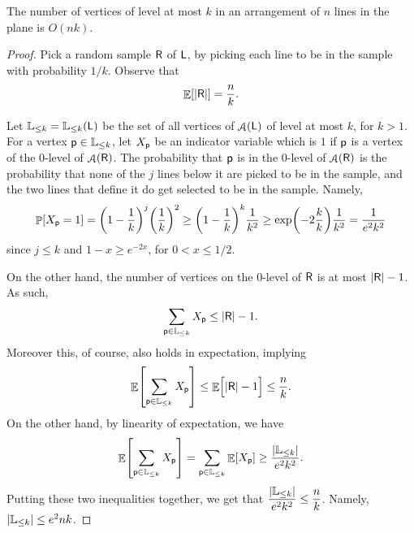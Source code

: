 \begin{theorem}
    The number of vertices of level at most $k$ in an arrangement of
    $n$ lines in the plane is $O(n k)$.

\end{theorem}

\begin{proof}
    Pick a random sample  $\mathsf{R}$ of
    $\mathsf{L}$, by picking each line to be in the sample with
    probability $1/k$. Observe that
    \[
        \mathop{\mathbb{E}}\!\left[ {\left| {\mathsf{R}} \right|} \right] = \frac{n}{k}.
    \]

    Let $\AtMostKLevelChar = \AtMostKLevel{\LineSet}$ be the set of
    all vertices of $\mathop{\mathrm{\EuScript{A}}}(\mathsf{L})$ of level at most $k$, for $k >
    1$.  For a vertex $\mathsf{p} \in \mathbb{L}_{\leq k}$, let $X_{\mathsf{p}}$ be an
    indicator variable which is $1$ if $\mathsf{p}$ is a vertex of the
    $0$-level of $\mathop{\mathrm{\EuScript{A}}}(\mathsf{R})$.  The probability that $\mathsf{p}$ is in
    the $0$-level of $\mathop{\mathrm{\EuScript{A}}}(\mathsf{R})$ is the probability that none of
    the $j$ lines below it are picked to be in the sample, and the two
    lines that define it do get selected to be in the sample. Namely,
    \[
    \Prob{ X_\pnt = 1 }%
    =%
    \pth[]{ 1- \frac{1}{k}}^j \pth{\frac{1}{k}}^2%
    \geq%
    \pth[]{ 1- \frac{1}{k}}^k \frac{1}{k^2}%
    \geq%
    \exp \pth{ - 2\frac{k}{k}} \frac{1}{k^2}%
    =%
    \frac{1}{e^2 k^2}
    \]
    since $j \leq k$ and $1- x \geq e^{-2x}$, for $0 < x \leq 1/2$.

    On the other hand, the number of vertices on the $0$-level of
    $\mathsf{R}$ is at most $\left| {\mathsf{R}} \right| -1$. As such,
    \[
    \sum_{\mathsf{p} \in \mathbb{L}_{\leq k}} X_{\mathsf{p}} \leq
    \left| {\mathsf{R}} \right| -1.
    \]
    Moreover this, of course, also holds in expectation, implying
    \[
    \Ex{ \sum_{\pnt \in \AtMostKLevelChar} X_\pnt }%
    \leq%
    \Ex{\Bigl.  \cardin{\Sample} -1 }%
    \leq%
    \frac{n}{k}.
    \]
    On the other hand, by linearity of expectation, we have
    \[
    \mathop{\mathbb{E}}\!\left[ { \sum_{\mathsf{p} \in \mathbb{L}_{\leq k}} X_{\mathsf{p}} } \right] = \sum_{\mathsf{p} \in
       \mathbb{L}_{\leq k}} \mathop{\mathbb{E}}\!\left[ { X_{\mathsf{p}} } \right] \geq
    \frac{\left| {\mathbb{L}_{\leq k}} \right| }{e^2 k^2}.
    \]
    Putting these two inequalities together, we get that
    $\displaystyle   \frac{\left| {\mathbb{L}_{\leq k}} \right| }{e^2 k^2} \leq
    \frac{n}{k}$.
    Namely, $\left| {\mathbb{L}_{\leq k}} \right| \leq e^2 n k$.
\end{proof}


% 
%

\ChapterEnd{}

 
